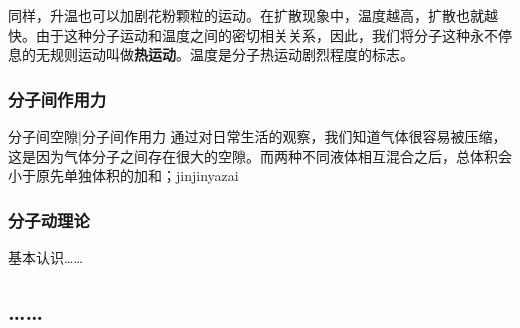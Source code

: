 同样，升温也可以加剧花粉颗粒的运动。在扩散现象中，温度越高，扩散也就越快。由于这种分子运动和温度之间的密切相关关系，因此，我们将分子这种永不停息的无规则运动叫做\textbf{热运动}。温度是分子热运动剧烈程度的标志。

\subsubsection{分子间作用力}
分子间空隙|分子间作用力
通过对日常生活的观察，我们知道气体很容易被压缩，这是因为气体分子之间存在很大的空隙。而两种不同液体相互混合之后，总体积会小于原先单独体积的加和；jinjinyazai
\subsubsection{分子动理论}
基本认识……

\subsection{……}
